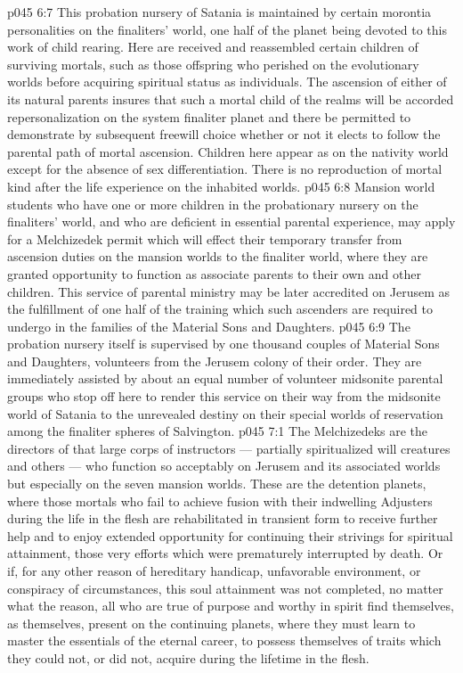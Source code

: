 \vs p045 6:7 \pc This probation nursery of Satania is maintained by certain morontia personalities on the finaliters’ world, one half of the planet being devoted to this work of child rearing. Here are received and reassembled certain children of surviving mortals, such as those offspring who perished on the evolutionary worlds before acquiring spiritual status as individuals. The ascension of either of its natural parents insures that such a mortal child of the realms will be accorded repersonalization on the system finaliter planet and there be permitted to demonstrate by subsequent freewill choice whether or not it elects to follow the parental path of mortal ascension. Children here appear as on the nativity world except for the absence of sex differentiation. There is no reproduction of mortal kind after the life experience on the inhabited worlds.
\vs p045 6:8 Mansion world students who have one or more children in the probationary nursery on the finaliters’ world, and who are deficient in essential parental experience, may apply for a Melchizedek permit which will effect their temporary transfer from ascension duties on the mansion worlds to the finaliter world, where they are granted opportunity to function as associate parents to their own and other children. This service of parental ministry may be later accredited on Jerusem as the fulfillment of one half of the training which such ascenders are required to undergo in the families of the Material Sons and Daughters.
\vs p045 6:9 The probation nursery itself is supervised by one thousand couples of Material Sons and Daughters, volunteers from the Jerusem colony of their order. They are immediately assisted by about an equal number of volunteer midsonite parental groups who stop off here to render this service on their way from the midsonite world of Satania to the unrevealed destiny on their special worlds of reservation among the finaliter spheres of Salvington.
\vs p045 7:1 The Melchizedeks are the directors of that large corps of instructors --- partially spiritualized will creatures and others --- who function so acceptably on Jerusem and its associated worlds but especially on the seven mansion worlds. These are the detention planets, where those mortals who fail to achieve fusion with their indwelling Adjusters during the life in the flesh are rehabilitated in transient form to receive further help and to enjoy extended opportunity for continuing their strivings for spiritual attainment, those very efforts which were prematurely interrupted by death. Or if, for any other reason of hereditary handicap, unfavorable environment, or conspiracy of circumstances, this soul attainment was not completed, no matter what the reason, all who are true of purpose and worthy in spirit find themselves, as themselves, present on the continuing planets, where they must learn to master the essentials of the eternal career, to possess themselves of traits which they could not, or did not, acquire during the lifetime in the flesh.

